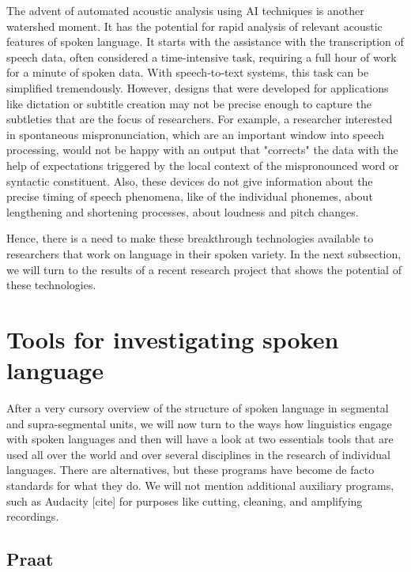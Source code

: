 The advent of automated acoustic analysis using AI techniques is another watershed moment. It has the potential for rapid analysis of relevant acoustic features of spoken language. It starts with the assistance with the transcription of speech data, often considered a time-intensive task, requiring a full hour of work for a minute of spoken data. With speech-to-text systems, this task can be simplified tremendously. However, designs that were developed for applications like dictation or subtitle creation may not be precise enough to capture the subtleties that are  the focus of researchers. For example, a researcher interested in spontaneous mispronunciation, which are an important window into speech processing, would not be happy with an output that "corrects" the data with the help of expectations triggered by the local context of the mispronounced word or syntactic constituent. Also, these devices do not give information about the precise timing of speech phenomena, like of the individual phonemes, about lengthening and shortening processes, about loudness and pitch changes. 

Hence, there is a need to make these breakthrough technologies available to researchers that work on language in their spoken variety. In the next subsection, we will turn to the results of a recent research project that shows the potential of these technologies. 


\section{Tools for investigating spoken language} 

After a very cursory overview of the structure of spoken language in segmental and supra-segmental units, we will now turn to the ways how linguistics engage with spoken languages and then will have a look at two essentials tools that are used all over the world and over several disciplines in the research of individual languages. There are alternatives, but these programs have become de facto standards for what they do. We will not mention additional auxiliary programs, such as Audacity [cite] for purposes like cutting, cleaning, and amplifying recordings. 


\subsection{Praat}


